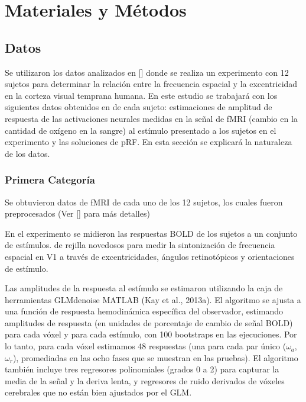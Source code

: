 \chapter{Materiales y M\'etodos}\label{chapter:materials_and_methods}


\section{Datos}

Se utilizaron los datos analizados en [\cite{broderick_mapping_2022}] donde se realiza un experimento con 12 sujetos para determinar la relación entre la frecuencia espacial y la excentricidad en la corteza visual temprana humana. En este estudio se trabajar\'a con los siguientes datos obtenidos en de cada sujeto: estimaciones de amplitud de respuesta de las activaciones neurales medidas en la se\~nal de fMRI (cambio en la cantidad de ox\'igeno en la sangre) al est\'imulo presentado a los sujetos en el experimento y las soluciones de pRF. En esta secci\'on se explicar\'a la naturaleza de los datos.

\subsection{Primera Categor\'ia}

Se obtuvieron datos de fMRI de cada uno de los 12 sujetos, los cuales fueron preprocesados (Ver [\cite{broderick_mapping_2022}] para m\'as detalles)

En el experimento se midieron las respuestas BOLD de los sujetos a un conjunto de estímulos.  de rejilla novedosos para medir la sintonización de frecuencia espacial en V1 a través de excentricidades, ángulos retinotópicos y orientaciones de estímulo. 

Las amplitudes de la respuesta al est\'imulo se estimaron utilizando la caja de herramientas GLMdenoise MATLAB (Kay et al., 2013a). El algoritmo se ajusta a una función de respuesta hemodinámica específica del observador, estimando amplitudes de respuesta (en unidades de porcentaje de cambio de señal BOLD) para cada vóxel y para cada estímulo, con 100 bootstraps en las ejecuciones. Por lo tanto, para cada vóxel estimamos 48 respuestas (una para cada par único ($\omega_a$,$\omega_r$), promediadas en las ocho fases que se muestran en las pruebas). El algoritmo también incluye tres regresores polinomiales (grados 0 a 2) para capturar la media de la señal y la deriva lenta, y regresores de ruido derivados de vóxeles cerebrales que no están bien ajustados por el GLM.

